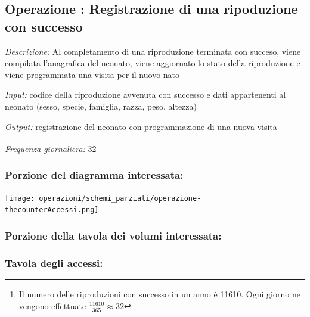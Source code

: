 \documentclass[12pt,a4paper]{article}
\begin{document}
\subsection*{Operazione \thecounterAccessi{}: Registrazione di una ripoduzione con successo}
\noindent\textit{Descrizione:} Al completamento di una riproduzione terminata con succeso, viene compilata l'anagrafica del neonato, viene aggiornato lo stato della riproduzione e viene programmata una visita per il nuovo nato

\noindent\textit{Input:} codice della riproduzione avvenuta con successo e dati appartenenti al neonato (sesso, specie, famiglia, razza, peso, altezza)

\noindent\textit{Output:} registrazione del neonato con programmazione di una nuova visita

\noindent\textit{Frequenza giornaliera:} 32\footnote{Il numero delle riproduzioni con successo in un anno è 11610. Ogni giorno ne vengono effettuate $\frac{11610}{365}\approx 32$}

\subsubsection*{Porzione del diagramma interessata:}

\texttt{[image: operazioni/schemi\_parziali/operazione-\\thecounterAccessi.png]} 
\subsubsection*{Porzione della tavola dei volumi interessata:}

\subsubsection*{Tavola degli accessi:}
\end{document}

